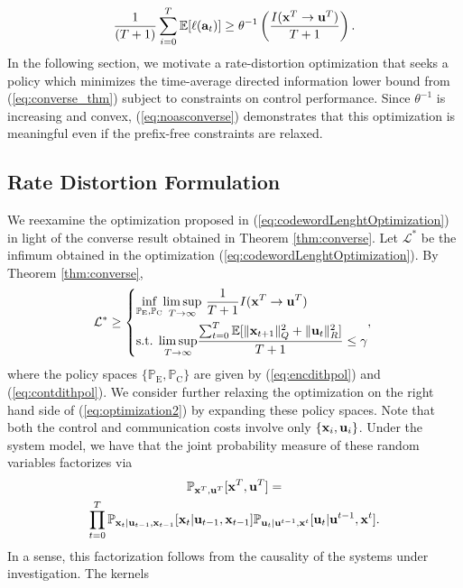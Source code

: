 \documentclass[letterpaper, 10 pt, conference]{ieeeconf}  %
\newcounter{constraint}[section]
\newcommand{\rvec}[1]{{\mathbf{\MakeLowercase{#1}}}}
\newcommand{\rs}[1]{\mathbf{\MakeLowercase{#1}}}
\begin{document}
 \begin{align} \label{eq:noasconverse}   \frac{1}{(T+1)}\sum_{i=0}^{T}\mathbb{E}[\ell(\rs{a}_t)] \ge  \theta^{-1}\left(\frac{I(\rs{x}^{T}\rightarrow\rs{u}^{T})}{T+1}\right).
 \end{align} In the following section, we motivate a rate-distortion optimization that seeks a policy which minimizes the time-average directed information lower bound from (\ref{eq:converse_thm}) subject to constraints on control performance. Since $\theta^{-1}$ is increasing and convex,  (\ref{eq:noasconverse}) demonstrates that this optimization is meaningful even if the prefix-free constraints are relaxed. 
 
\subsection{Rate Distortion Formulation}\label{ssec:rdf}
We reexamine the optimization proposed in (\ref{eq:codewordLenghtOptimization}) in light of the converse result obtained in Theorem \ref{thm:converse}. Let $\mathcal{L}^*$ be the infimum obtained in the optimization (\ref{eq:codewordLenghtOptimization}). By Theorem \ref{thm:converse},
\begin{align}\label{eq:optimization2}
    \mathcal{L}^*\ge \left\{\begin{aligned}
& \underset{\mathbb{P}_\mathrm{E}, \mathbb{P}_{\mathrm{C}}}{\inf}  \underset{T\rightarrow \infty}{\lim\sup}\text{ }\frac{1}{T+1}I(\rs{x}^T\rightarrow\rs{u}^{T}) \\ &\text{s.t. }   \underset{T\rightarrow \infty}{\lim\sup}\frac{\sum\nolimits_{t=0}^{T}\mathbb{E}[\lVert \rvec{x}_{t+1} \rVert_{{Q}}^{2} +\lVert \rvec{u}_{t} \rVert_{{R}}^{2}]}{T+1} \le \gamma
\end{aligned}, \right. 
\end{align} where the policy spaces $\{\mathbb{P}_\mathrm{E}, \mathbb{P}_{\mathrm{C}}\}$ are given by (\ref{eq:encdithpol}) and (\ref{eq:contdithpol}). We consider further relaxing the optimization on the right hand side of (\ref{eq:optimization2}) by expanding these policy spaces. Note that both the control and communication costs involve only $\{\rs{x}_{i},\rs{u}_{i}\}$. Under the system model, we have that the joint probability measure of these random variables factorizes via
\begin{multline}
    \mathbb{P}_{\rs{x}^{T},\rs{u}^{T}}[\rs{x}^{T},\rs{u}^{T}] =\\ \prod_{t=0}^{T} \mathbb{P}_{\rs{x}_{t}|\rs{u}_{t-1},\rs{x}_{t-1}}[\rs{x}_{t}|\rs{u}_{t-1},\rs{x}_{t-1}]\mathbb{P}_{\rs{u}_{t}|\rs{u}^{t-1},\rs{x}^{t}}[\rs{u}_{t}|\rs{u}^{t-1},\rs{x}^{t}].\nonumber
\end{multline}  In a sense, this factorization follows from the causality of the systems under investigation. The kernels
\end{document}

